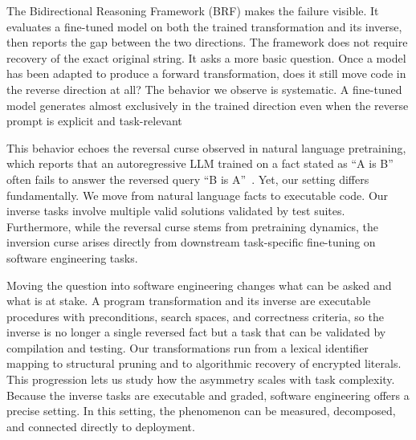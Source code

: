 The Bidirectional Reasoning Framework (BRF) makes the failure visible. It evaluates a fine-tuned model on both the
trained transformation and its inverse, then reports the gap between the two
directions. The framework does not require recovery of the exact original string.
It asks a more basic question. Once a model has been adapted to produce a forward
transformation, does it still move code in the reverse direction at all? The
behavior we observe is systematic. A fine-tuned model generates almost
exclusively in the trained direction even when the reverse prompt is explicit and
task-relevant


This behavior echoes the reversal curse observed in natural language pretraining, which reports that an autoregressive LLM
trained on a fact stated as ``A is B'' often fails to answer the reversed query
``B is A''~\cite{zhang2024directional, grosse2023influence}. Yet, our setting differs fundamentally. We move from natural language facts to executable code. Our inverse tasks involve multiple valid solutions validated by test suites. Furthermore, while the reversal curse stems from pretraining dynamics, the inversion curse arises directly from downstream task-specific fine-tuning on software engineering tasks.

Moving the question into software engineering changes what can be asked and what
is at stake. A program transformation and its inverse are executable procedures
with preconditions, search spaces, and correctness criteria, so the inverse is no
longer a single reversed fact but a task that can be validated by compilation and
testing. Our transformations run from a lexical
identifier mapping to structural pruning and to algorithmic recovery of encrypted
literals. This progression lets us study how the asymmetry scales with task complexity.
Because the inverse tasks are executable and graded, software engineering offers a precise setting. In this setting, the phenomenon can be measured, decomposed, and connected directly to deployment.

